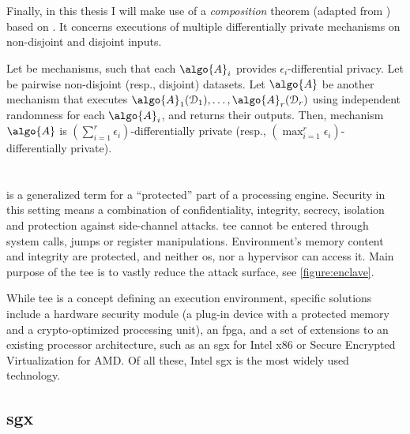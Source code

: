 				Finally, in this thesis I will make use of a \emph{composition} theorem (adapted from \cite{privacy-integrated-queries}) based on \cite{differential-privacy-original,our-data-ourselves}. %
				It concerns executions of multiple differentially private mechanisms on non-disjoint and disjoint inputs.

				\begin{theorem}\label{theorem:composition}
					Let  be mechanisms, such that each $\algo{A}_i$ provides $\epsilon_i$-differential privacy.
					Let  be pairwise non-disjoint (resp., disjoint) datasets.
					Let $\algo{A}$ be another mechanism that executes $\algo{A}_1(\database_1), \ldots, \algo{A}_r(\database_r)$ using independent randomness for each $\algo{A}_i$, and returns their outputs.
					Then, mechanism $\algo{A}$ is $\left( \sum_{i=1}^r \epsilon_i \right)$-differentially private (resp., $\left( \max_{i=1}^r \epsilon_i \right)$-differentially private).
				\end{theorem}

	\section{\texorpdfstring{}{Trusted Execution Environments}}

		 is a generalized term for a ``protected'' part of a processing engine.
		Security in this setting means a combination of confidentiality, integrity, secrecy, isolation and protection against side-channel attacks.
		\acrshort{tee} cannot be entered through system calls, jumps or register manipulations.
		Environment's memory content and integrity are protected, and neither \acrshort{os}, nor a hypervisor can access it.
		Main purpose of the \acrshort{tee} is to vastly reduce the attack surface, see \cref{figure:enclave}.

		

		While \acrshort{tee} is a concept defining an execution environment, specific solutions include a hardware security module (a plug-in device with a protected memory and a crypto-optimized processing unit), an \acrshort{fpga}, and a set of extensions to an existing processor architecture, such as an \acrshort{sgx} for Intel x86 or Secure Encrypted Virtualization \cite{amd-memory-encryption} for AMD\@.
		Of all these, Intel \acrshort{sgx} is the most widely used technology.

		\subsection{\texorpdfstring{\acrlong{sgx}}{Software Guard Extensions}}

